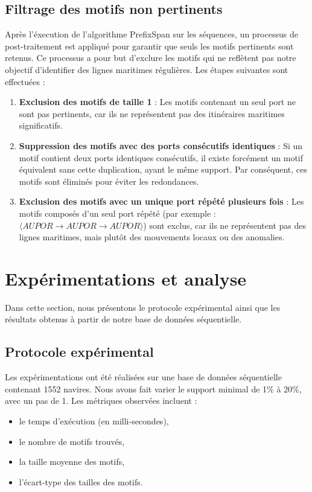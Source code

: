 \documentclass[a4paper,12pt]{article}
\begin{document}
\subsection{Filtrage des motifs non pertinents}
Après l'éxecution de l'algorithme PrefixSpan sur les séquences, un processus de post-traitement est appliqué pour garantir que seuls les motifs pertinents sont retenus. Ce processus a pour but d'exclure les motifs qui ne reflètent pas notre objectif d'identifier des lignes maritimes régulières. Les étapes suivantes sont effectuées :

\begin{enumerate}
    \item \textbf{Exclusion des motifs de taille 1} : Les motifs contenant un seul port ne sont pas pertinents, car ils ne représentent pas des itinéraires maritimes significatifs.
    \item \textbf{Suppression des motifs avec des ports consécutifs identiques} : Si un motif contient deux ports identiques consécutifs, il existe forcément un motif équivalent sans cette duplication, ayant le même support. Par conséquent, ces motifs sont éliminés pour éviter les redondances.
    \item \textbf{Exclusion des motifs avec un unique port répété plusieurs fois} : Les motifs composés d’un seul port répété (par exemple : $\langle AUPOR \to AUPOR \to AUPOR \rangle$) sont exclus, car ils ne représentent pas des lignes maritimes, mais plutôt des mouvements locaux ou des anomalies.
\end{enumerate}



\newpage

\newpage
\section{Expérimentations et analyse}


Dans cette section, nous présentons le protocole expérimental ainsi que les résultats obtenus à partir de notre base de données séquentielle. 

\subsection{Protocole expérimental}
Les expérimentations ont été réalisées sur une base de données séquentielle contenant 1552 navires. Nous avons fait varier le support minimal de 1\% à 20\%, avec un pas de 1. Les métriques observées incluent :
\begin{itemize}
    \item le temps d'exécution (en milli-secondes),
    \item le nombre de motifs trouvés,
    \item la taille moyenne des motifs,
    \item l'écart-type des tailles des motifs.
\end{itemize}
\end{document}
